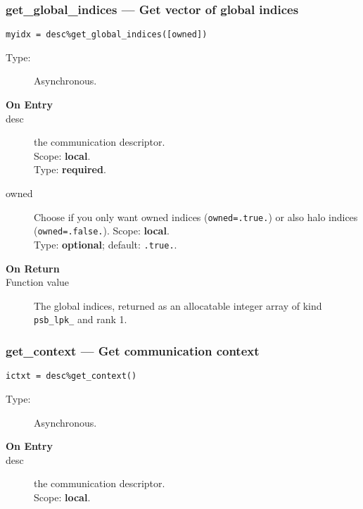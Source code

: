 \subsubsection{get\_global\_indices --- Get vector of global indices}

\begin{verbatim}
myidx = desc%get_global_indices([owned])
\end{verbatim}

\begin{description}
\item[Type:] Asynchronous.
\item[\bf On Entry]
\item[desc] the communication descriptor.\\
Scope: {\bf local}.\\
Type: {\bf required}.\\
\item[owned] Choose if you only want owned indices
  (\verb|owned=.true.|) or also halo indices (\verb|owned=.false.|). 
Scope: {\bf local}.\\
Type: {\bf optional}; default: \verb|.true.|.\\
\end{description}

\begin{description}
\item[\bf On Return]
\item[Function value] The global indices, returned as an allocatable
  integer array of kind \verb|psb_lpk_|  and rank 1. 
\end{description}



\subsubsection{get\_context --- Get communication context}

\begin{verbatim}
ictxt = desc%get_context()
\end{verbatim}

\begin{description}
\item[Type:] Asynchronous.
\item[\bf On Entry]
\item[desc] the communication descriptor.\\
Scope: {\bf local}.\\
\end{description}

